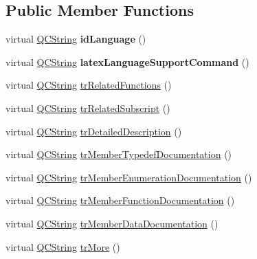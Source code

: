 \subsection*{Public Member Functions}
\begin{DoxyCompactItemize}
\item 
\mbox{\label{class_translator_slovak_a36f7656bf022785deef9db07768c94ee}} 
virtual \mbox{\hyperlink{class_q_c_string}{Q\+C\+String}} {\bfseries id\+Language} ()
\item 
\mbox{\label{class_translator_slovak_adc97ee021c2378a02ce1916463e88a38}} 
virtual \mbox{\hyperlink{class_q_c_string}{Q\+C\+String}} {\bfseries latex\+Language\+Support\+Command} ()
\item 
virtual \mbox{\hyperlink{class_q_c_string}{Q\+C\+String}} \mbox{\hyperlink{class_translator_slovak_af3a23ecca41b6e87e3d51b461b5311bb}{tr\+Related\+Functions}} ()
\item 
virtual \mbox{\hyperlink{class_q_c_string}{Q\+C\+String}} \mbox{\hyperlink{class_translator_slovak_afb74f2844f415258b1c28c6b79d0f4c2}{tr\+Related\+Subscript}} ()
\item 
virtual \mbox{\hyperlink{class_q_c_string}{Q\+C\+String}} \mbox{\hyperlink{class_translator_slovak_a33658a3393cb99b1dd159236376e24df}{tr\+Detailed\+Description}} ()
\item 
virtual \mbox{\hyperlink{class_q_c_string}{Q\+C\+String}} \mbox{\hyperlink{class_translator_slovak_af683538686cc6aeaa8aef61445787daa}{tr\+Member\+Typedef\+Documentation}} ()
\item 
virtual \mbox{\hyperlink{class_q_c_string}{Q\+C\+String}} \mbox{\hyperlink{class_translator_slovak_af05760ae867cbacf2097d6eb86c0ca8d}{tr\+Member\+Enumeration\+Documentation}} ()
\item 
virtual \mbox{\hyperlink{class_q_c_string}{Q\+C\+String}} \mbox{\hyperlink{class_translator_slovak_a6cf37579edda4949016b07e25d39768b}{tr\+Member\+Function\+Documentation}} ()
\item 
virtual \mbox{\hyperlink{class_q_c_string}{Q\+C\+String}} \mbox{\hyperlink{class_translator_slovak_a7023168878df92e5fbec32ee07c07e39}{tr\+Member\+Data\+Documentation}} ()
\item 
virtual \mbox{\hyperlink{class_q_c_string}{Q\+C\+String}} \mbox{\hyperlink{class_translator_slovak_a93cc2233a9c0d500d8d4c0f09d93ec04}{tr\+More}} ()
\item 

\end{DoxyCompactItemize}
